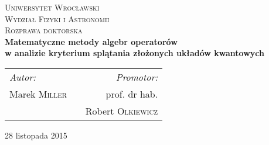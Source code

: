 \begin{titlepage}

\begin{center}

\textsc{\LARGE Uniwersytet Wrocławski}\\[0.5cm]
\textsc{\Large Wydział Fizyki i Astronomii} \\[1.5cm]
\textsc{\Large Rozprawa doktorska} \\[2cm]

{ \Large \bfseries
    Matematyczne metody algebr operatorów\\
    w analizie kryterium splątania
    złożonych układów kwantowych
}\\[3cm]

{ \large
\begin{center}
\begin{tabular}{lcr}
\emph{Autor:} & \hspace{3cm} & \emph{Promotor:}\\
Marek \textsc{Miller} & & prof. dr hab. \\
    & & Robert \textsc{Olkiewicz}
\end{tabular}
\end{center}
}

\vfill


{\large 28 listopada 2015}
\end{center}

\end{titlepage}
